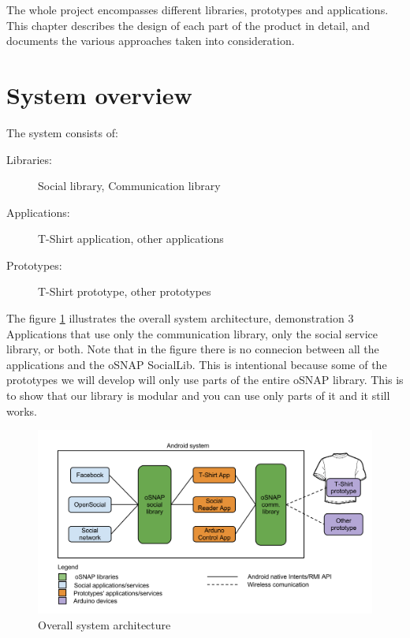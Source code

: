 

The whole project encompasses different libraries, prototypes and applications.
This chapter describes the design of each part of the product in detail,
and documents the various approaches taken into consideration.

\section{System overview}

The system consists of:
\begin{description}
	\item[Libraries:] Social library, Communication library
	\item[Applications:] T-Shirt application, other applications
	\item[Prototypes:] T-Shirt prototype, other prototypes
\end{description}

The figure \ref{fig:design-toplevel} illustrates the overall system architecture, demonstration 3 Applications that use only the communication library, only the social service library, or both. Note that in the figure there is no connecion between all the applications and the oSNAP SocialLib. This is intentional because some of the prototypes we will develop will only
use parts of the entire oSNAP library. This is to show that our library is modular and you can use only parts of it and it still works.

\begin{figure}[h!]
	\centering \includegraphics[scale=0.35]{img/design-toplevel.png}
	\caption{Overall system architecture}
	\label{fig:design-toplevel}
\end{figure}


